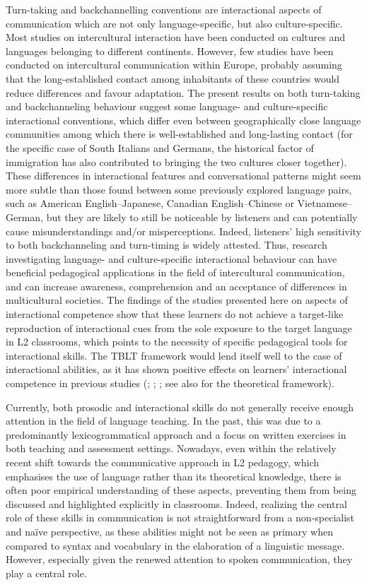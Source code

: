 Turn-taking and backchannelling conventions are interactional aspects of communication which are not only language-specific, but also culture-specific. Most studies on intercultural interaction have been conducted on cultures and languages belonging to different continents. However, few studies have been conducted on intercultural communication within Europe, probably assuming that the long-established contact among inhabitants of these countries would reduce differences and favour adaptation. The present results on both turn-taking and backchanneling behaviour suggest some language- and culture-specific interactional conventions, which differ even between geographically close language communities among which there is well-established and long-lasting contact (for the specific case of South Italians and Germans, the historical factor of immigration has also contributed to bringing the two cultures closer together). These differences in interactional features and conversational patterns might seem more subtle than those found between some previously explored language pairs, such as American English–Japanese, Canadian English–Chinese or Vietnamese–German, but they are likely to still be noticeable by listeners and can potentially cause misunderstandings and/or misperceptions. Indeed, listeners’ high sensitivity to both backchanneling and turn-timing is widely attested. Thus, research investigating language- and culture-specific interactional behaviour can have beneficial pedagogical applications in the field of intercultural communication, and can increase awareness, comprehension and an acceptance of differences in multicultural societies. The findings of the studies presented here on aspects of interactional competence show that these learners do not achieve a target-like reproduction of interactional cues from the sole exposure to the target language in L2 classrooms, which points to the necessity of specific pedagogical tools for interactional skills. The TBLT framework would lend itself well to the case of interactional abilities, as it has shown positive effects on learners’ interactional competence in previous studies (\citealt{Pérez2016}; \citealt{Waluyo2019}; \citealt{FangEtAl2021}; see also \citealt{ZieglerBryfonski2016} for the theoretical framework).

Currently, both prosodic and interactional skills do not generally receive enough attention in the field of language teaching. In the past, this was due to a predominantly lexicogrammatical approach and a focus on written exercises in both teaching and assessment settings. Nowadays, even within the relatively recent shift towards the communicative approach in L2 pedagogy, which emphasises the use of language rather than its theoretical knowledge, there is often poor empirical understanding of these aspects, preventing them from being discussed and highlighted explicitly in classrooms. Indeed, realizing the central role of these skills in communication is not straightforward from a non-specialist and naïve perspective, as these abilities might not be seen as primary when compared to syntax and vocabulary in the elaboration of a linguistic message. However, especially given the renewed attention to spoken communication, they play a central role.

